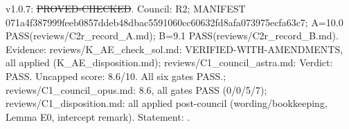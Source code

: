 \begin{proposition}\label{reg:W3-POST2_A2}
\end{proposition}
\begin{statusbox}
 v1.0.7: \st{PROVED-CHECKED}. Council: R2; MANIFEST 071a4f387999feeb0857ddeb48dbac5591060cc60632fd8afa073975ecfa63c7; A=10.0 PASS(reviews/C2r\_record\_A.md); B=9.1 PASS(reviews/C2r\_record\_B.md). Evidence: reviews/K\_AE\_check\_sol.md: VERIFIED-WITH-AMENDMENTS, all applied (K\_AE\_disposition.md); reviews/C1\_council\_astra.md: Verdict: PASS. Uncapped score: 8.6/10. All six gates PASS.; reviews/C1\_council\_opus.md: 8.6, all gates PASS (0/0/5/7); reviews/C1\_disposition.md: all applied post-council (wording/bookkeeping, Lemma E0, intercept remark). Statement: .
\end{statusbox}
